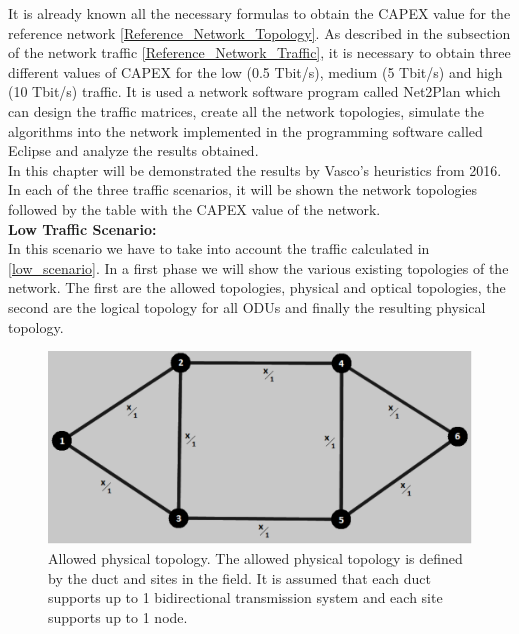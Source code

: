 It is already known all the necessary formulas to obtain the CAPEX value for the reference network \ref{Reference_Network_Topology}. As described in the subsection of the network traffic \ref{Reference_Network_Traffic}, it is necessary to obtain three different values of CAPEX for the low (0.5 Tbit/s), medium (5 Tbit/s) and high (10 Tbit/s) traffic. It is used a network software program called Net2Plan which can design the traffic matrices, create all the network topologies, simulate the algorithms into the network implemented in the programming software called Eclipse and analyze the results obtained.\\
In this chapter will be demonstrated the results by Vasco's heuristics from 2016. In each of the three traffic scenarios, it will be shown the network topologies followed by the table with the CAPEX value of the network.\\

\noindent
\textbf{Low Traffic Scenario:}\\

In this scenario we have to take into account the traffic calculated in \ref{low_scenario}. In a first phase we will show the various existing topologies of the network. The first are the allowed topologies, physical and optical topologies, the second are the logical topology for all ODUs and finally the resulting physical topology.\\

\begin{figure}[H]
\centering
\includegraphics[width=13cm]{sdf/heuristic/opaque_survivability/figures/allowed_physical}
\caption{Allowed physical topology. The allowed physical topology is defined by the duct and sites in the field. It is assumed that each duct supports up to 1 bidirectional transmission system and each site supports up to 1 node.}
\label{allowed_physical_surv_ref_low_heuristic}
\end{figure}

